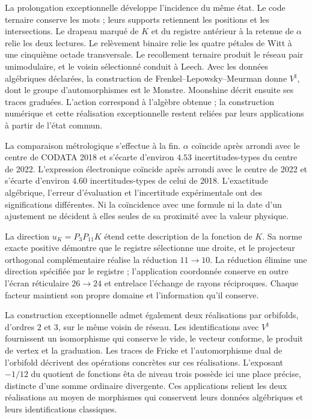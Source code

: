 La prolongation exceptionnelle développe l'incidence du même état. Le code ternaire conserve les mots ; leurs supports retiennent les positions et les intersections. Le drapeau marqué de \(K\) et du registre antérieur à la retenue de \(\alpha\) relie les deux lectures. Le relèvement binaire relie les quatre pétales de Witt à une cinquième octade transversale. Le recollement ternaire produit le réseau pair unimodulaire, et le voisin sélectionné conduit à Leech. Avec les données algébriques déclarées, la construction de Frenkel--Lepowsky--Meurman donne \(V^\natural\), dont le groupe d'automorphismes est le Monstre\cite{flm}. Moonshine décrit ensuite ses traces graduées\cite{borcherds}. L'action correspond à l'algèbre obtenue ; la construction numérique et cette réalisation exceptionnelle restent reliées par leurs applications à partir de l'état commun.

La comparaison métrologique s'effectue à la fin\cite{codata2018,codata2022}. \(\alpha\) coïncide après arrondi avec le centre de CODATA 2018 et s'écarte d'environ \(4.53\) incertitudes-types du centre de 2022. L'expression électronique coïncide après arrondi avec le centre de 2022 et s'écarte d'environ \(4.60\) incertitudes-types de celui de 2018. L'exactitude algébrique, l'erreur d'évaluation et l'incertitude expérimentale ont des significations différentes. Ni la coïncidence avec une formule ni la date d'un ajustement ne décident à elles seules de sa proximité avec la valeur physique.



La direction \(u_K=P_3P_{11}K\) étend cette description de la fonction de \(K\). Sa norme exacte positive démontre que le registre sélectionne une droite, et le projecteur orthogonal complémentaire réalise la réduction \(11\to10\). La réduction élimine une direction spécifiée par le registre ; l'application coordonnée conserve en outre l'écran réticulaire \(26\to24\) et entrelace l'échange de rayons réciproques. Chaque facteur maintient son propre domaine et l'information qu'il conserve.

La construction exceptionnelle admet également deux réalisations par
orbifolds, d'ordres \(2\) et \(3\), sur le même voisin de réseau.
Les identifications avec \(V^\natural\) fournissent un isomorphisme
qui conserve le vide, le vecteur conforme, le produit de vertex et
la graduation. Les traces de Fricke et l'automorphisme dual de l'orbifold
décrivent des opérations concrètes sur ces réalisations. L'exposant
\(-1/12\) du quotient de fonctions êta de niveau trois possède ici
une place précise, distincte d'une somme ordinaire divergente.
Ces applications relient les deux réalisations au moyen de morphismes
qui conservent leurs données algébriques et leurs identifications classiques.

